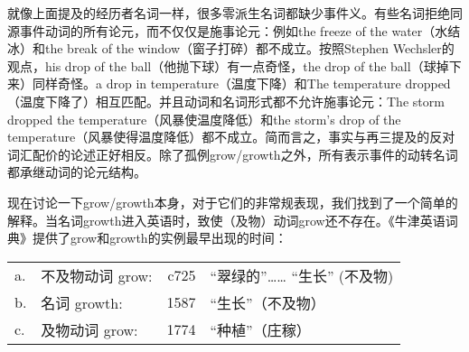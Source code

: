 \begin{exe}
\begin{xlist}[iv.]
\begin{exe}
\begin{xlist}[iv.]
就像上面提及的经历者名词一样，很多零派生名词都缺少事件义。有些名词拒绝同源事件动词的所有论元，而不仅仅是施事论元：例如the freeze of the water（水结冰）和the break of the window（窗子打碎）都不成立。按照Stephen Wechsler的观点，his drop of the ball（他抛下球）有一点奇怪，the drop of the ball（球掉下来）同样奇怪。a drop in temperature（温度下降）和The temperature dropped（温度下降了）相互匹配。并且动词和名词形式都不允许施事论元：The storm
  dropped the temperature（风暴使温度降低）和the storm's drop of the temperature（风暴使得温度降低）都不成立。简而言之，事实与再三提及的反对词汇配价的论述正好相反。除了孤例grow/growth之外，所有表示事件的动转名词都承继动词的论元结构。

现在讨论一下grow/growth本身，对于它们的非常规表现，我们找到了一个简单的解释\citep{Wechsler2008a}。当名词growth进入英语时，致使（及物）动词grow还不存在。《牛津英语词典》提供了grow和growth的实例最早出现的时间：

\ea
\label{oed}
\begin{tabular}[t]{@{}l@{~}lrl@{}} 
a. & 不及物动词 grow: &  c725	& “翠绿的”……{} “生长” (不及物)\\
b. & 名词 growth:   &  1587	& “生长”（不及物）\\
c. & 及物动词 grow:   &  1774	& “种植”（庄稼）\\
\end{tabular}
\z


\end{xlist}
\end{exe}
\end{xlist}
\end{exe}
